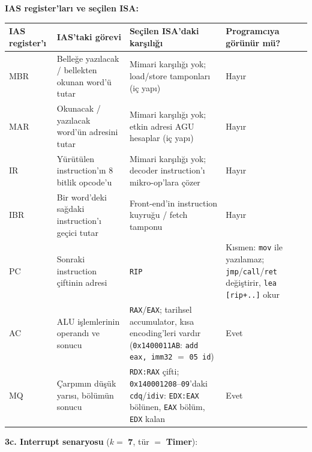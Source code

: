 \documentclass[11pt,a4paper]{article}
\newcommand{\tl}{\texttt}
\newcommand{\hd}[1]{\cellcolor{hdr}#1}
\begin{document}
\textbf{IAS register'ları ve seçilen ISA:}

\begin{longtable}{|p{1.2cm}|p{4.3cm}|p{6.6cm}|p{3.0cm}|}
\hline
\hd{IAS register'ı} & \hd{IAS'taki görevi} & \hd{Seçilen ISA'daki karşılığı} & \hd{Programcıya görünür mü?}\\
\hline
\endhead
MBR & Belleğe yazılacak / bellekten okunan word'ü tutar & Mimari karşılığı yok; load/store tamponları (iç yapı) & Hayır\\ \hline
MAR & Okunacak / yazılacak word'ün adresini tutar & Mimari karşılığı yok; etkin adresi AGU hesaplar (iç yapı) & Hayır\\ \hline
IR & Yürütülen instruction'ın 8 bitlik opcode'u & Mimari karşılığı yok; decoder instruction'ı mikro-op'lara çözer & Hayır\\ \hline
IBR & Bir word'deki sağdaki instruction'ı geçici tutar & Front-end'in instruction kuyruğu / fetch tamponu & Hayır\\ \hline
PC & Sonraki instruction çiftinin adresi & \tl{RIP} & Kısmen: \tl{mov} ile yazılamaz; \tl{jmp}/\tl{call}/\tl{ret} değiştirir, \tl{lea [rip+..]} okur\\ \hline
AC & ALU işlemlerinin operandı ve sonucu & \tl{RAX}/\tl{EAX}; tarihsel accumulator, kısa encoding'leri vardır (\tl{0x1400011AB}: \tl{add eax, imm32} $=$ \tl{05 id}) & Evet\\ \hline
MQ & Çarpımın düşük yarısı, bölümün sonucu & \tl{RDX:RAX} çifti; \tl{0x140001208}--\tl{09}'daki \tl{cdq}/\tl{idiv}: \tl{EDX:EAX} bölünen, \tl{EAX} bölüm, \tl{EDX} kalan & Evet\\ \hline
\end{longtable}

\textbf{3c. Interrupt senaryosu} ($k = $ \textbf{7}, tür $=$ \textbf{Timer}):
\end{document}
